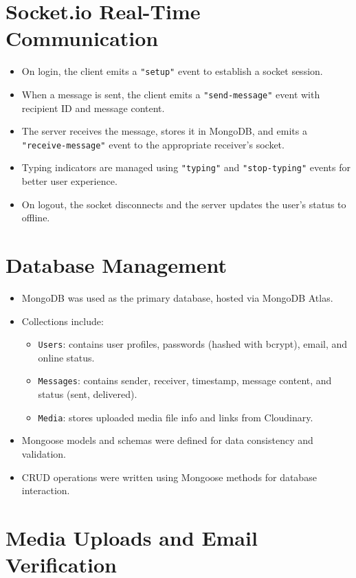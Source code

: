 \documentclass[12pt,a4paper]{report}
\begin{document}
\section{Socket.io Real-Time Communication}
\begin{itemize}
    \item On login, the client emits a \texttt{"setup"} event to establish a socket session.
    \item When a message is sent, the client emits a \texttt{"send-message"} event with recipient ID and message content.
    \item The server receives the message, stores it in MongoDB, and emits a \texttt{"receive-message"} event to the appropriate receiver's socket.
    \item Typing indicators are managed using \texttt{"typing"} and \texttt{"stop-typing"} events for better user experience.
    \item On logout, the socket disconnects and the server updates the user’s status to offline.
\end{itemize}

\section{Database Management}
\begin{itemize}
    \item MongoDB was used as the primary database, hosted via MongoDB Atlas.
    \item Collections include:
    \begin{itemize}
        \item \texttt{Users}: contains user profiles, passwords (hashed with bcrypt), email, and online status.
        \item \texttt{Messages}: contains sender, receiver, timestamp, message content, and status (sent, delivered).
        \item \texttt{Media}: stores uploaded media file info and links from Cloudinary.
    \end{itemize}
    \item Mongoose models and schemas were defined for data consistency and validation.
    \item CRUD operations were written using Mongoose methods for database interaction.
\end{itemize}

\section{Media Uploads and Email Verification}
  
\end{document}
